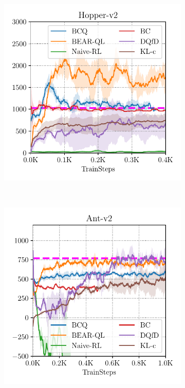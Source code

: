 \begin{figure}
\begin{subfigure}[t]{0.23\textwidth}
    \end{subfigure}
    ~
    \begin{subfigure}[t]{0.23\textwidth}
        \centering
        \includegraphics[width=0.99\linewidth]{chapters/bear/images/images_camera_ready/hopper_mediocre_camera_ready.pdf}
    \end{subfigure}
    ~
    \begin{subfigure}[t]{0.23\textwidth}
        \centering
        \includegraphics[width=0.99\linewidth]{chapters/bear/images/images_camera_ready/ant_mediocre_camera_ready.pdf}

\end{subfigure}
\end{figure}
